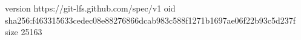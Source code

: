 version https://git-lfs.github.com/spec/v1
oid sha256:f463315633cedec08e88276866dcab983c588f1271b1697ae06f22b93c5d237f
size 25163
